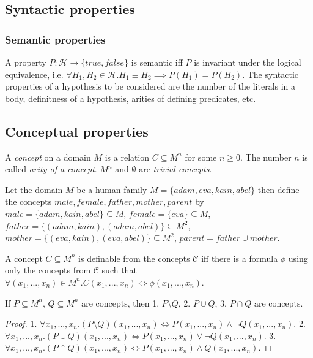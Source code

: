 \subsection{Syntactic properties}

\subsubsection{Semantic properties}
A property $P:\mathcal{H} \to \{true, false\}$ is semantic iff $P$ is invariant under the logical equivalence, i.e.
$\forall H_1, H_2 \in \mathcal{H}. H_1 \equiv H_2 \implies P(H_1)=P(H_2)$.
The syntactic properties of a hypothesis to be considered are the number of the literals in a body, definitness of a hypothesis, arities of defining predicates, etc.


\subsection{Conceptual properties}
\begin{defn}
A \emph{concept} on a domain $M$ is a relation $C \subseteq M^n$ for some $n \ge 0$.
The number $n$ is called \emph{arity of a concept}.
$M^n$ and $\emptyset$ are \emph{trivial concepts}.
\end{defn}

\begin{exmp}
Let the domain $M$ be a human family $M=\{adam, eva, kain, abel\}$ then define the concepts $male, female, father, mother, parent$ by
$male=\{adam, kain, abel\}\subseteq{M}$,
$female=\{eva\}\subseteq{M}$,
$father=\{(adam,kain), (adam,abel)\}\subseteq{M^2}$,
$mother=\{(eva,kain), (eva,abel)\}\subseteq{M^2}$,
$parent=father \cup mother$.
\end{exmp}
\begin{defn}
A concept $C\subseteq M^n$ is definable from the concepts $\mathcal{C}$ iff there is a formula $\phi$ using only the concepts from $\mathcal{C}$ such that
$\forall (x_1, ..., x_n) \in M^n. C(x_1, ..., x_n) \iff \phi(x_1, ..., x_n)$.
\end{defn}
\begin{corollary}
If $P\subseteq{M^n}$, $Q\subseteq{M^n}$ are concepts, then
1. $P \setminus Q$, 2. $P \cup Q$, 3. $P \cap Q$ are concepts.
\end{corollary}
\begin{proof}
1. $\forall x_1, ..., x_n. (P \setminus Q)(x_1, ..., x_n) \iff
P(x_1, ..., x_n) \land \neg Q(x_1, ..., x_n)$.
2. $\forall x_1, ..., x_n. (P \cup Q)(x_1, ..., x_n) \iff
P(x_1, ..., x_n) \lor \neg Q(x_1, ..., x_n)$.
3. $\forall x_1, ..., x_n. (P \cap Q)(x_1, ..., x_n) \iff
P(x_1, ..., x_n) \land Q(x_1, ..., x_n)$.
\end{proof}

